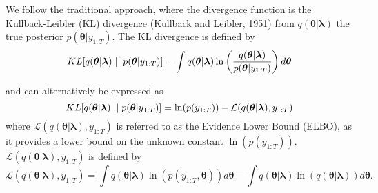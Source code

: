 \documentclass[12pt,a4paper]{article}%
\numberwithin{equation}{section}
\begin{document}
We follow the traditional approach, where the divergence function is the Kullback-Leibler (KL) divergence (Kullback and Leibler, 1951) from $q(\boldsymbol{\theta} | \boldsymbol{\lambda})$ the true posterior $p(\boldsymbol{\theta} | y_{1:T})$. The KL divergence is defined by
\begin{equation}
\label{KL-def}
KL[q(\boldsymbol{\theta} | \boldsymbol{\lambda})\hspace{.1cm}||\hspace{.1cm}p(\boldsymbol{\theta} | y_{1:T})] = \int q(\boldsymbol{\theta} | \boldsymbol{\lambda}) \ln \left( \frac{q(\boldsymbol{\theta} | \boldsymbol{\lambda})}{p(\boldsymbol{\theta} |y_{1:T})}\right) d\boldsymbol{\theta}
\end{equation}

and can alternatively be expressed as
\begin{equation}
\label{KL-ELBO}
KL[q(\boldsymbol{\theta} | \boldsymbol{\lambda})\hspace{.1cm}||\hspace{.1cm}p(\boldsymbol{\theta} | y_{1:T})] = \ln(p(y_{1:T})) - \mathcal{L}(q(\boldsymbol{\theta} | \boldsymbol{\lambda}), y_{1:T})
\end{equation}
where $\mathcal{L}(q(\boldsymbol{\theta} | \boldsymbol{\lambda}), y_{1:T})$ is referred to as the Evidence Lower Bound (ELBO), as it provides a lower bound on the unknown constant $\ln(p(y_{1:T}))$.  $\mathcal{L}(q(\boldsymbol{\theta} | \boldsymbol{\lambda}), y_{1:T})$ is defined by
\begin{equation}
\label{ELBO}
\mathcal{L}(q(\boldsymbol{\theta} | \boldsymbol{\lambda}), y_{1:T}) = \int q(\boldsymbol{\theta} | \boldsymbol{\lambda}) \ln (p(y_{1:T},\boldsymbol{\theta})) d\boldsymbol{\theta} -  \int q(\boldsymbol{\theta} | \boldsymbol{\lambda}) \ln (q(\boldsymbol{\theta} | \boldsymbol{\lambda})) d\boldsymbol{\theta}.
\end{equation}
\end{document}
